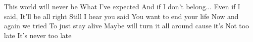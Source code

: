 This world will never be
What I've expected
And if I don't belong...
Even if I said,
It'll be all right
Still I hear you said
You want to end your life
Now and again we tried
To just stay alive
Maybe will turn it all around cause it's
Not too late
It's never too late